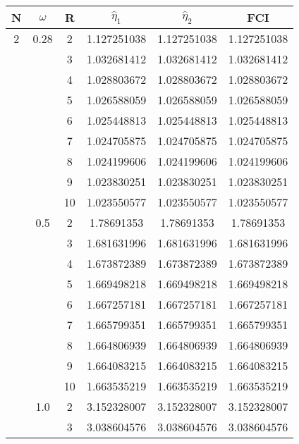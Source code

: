 \begin{table}[h!]
\begin{center}

\begin{tabular}{|c|c|c|c|c|c|}
\hline\hline
N&$\omega$ &R & $\hat{\eta}_1$ & $\hat{\eta}_2$ & FCI \\
\hline    
2 &  0.28   & 2 &  1.127251038    & 1.127251038   & 1.127251038        \\
 &         & 3 & 1.032681412     & 1.032681412   & 1.032681412            \\
 &         & 4 & 1.028803672     & 1.028803672   & 1.028803672            \\
 &         & 5 & 1.026588059     & 1.026588059      & 1.026588059         \\
 &         & 6 & 1.025448813     & 1.025448813   & 1.025448813          \\
 &         & 7 & 1.024705875     & 1.024705875    & 1.024705875        \\
 &         & 8 & 1.024199606    & 1.024199606      & 1.024199606          \\
 &         & 9 & 1.023830251    & 1.023830251    & 1.023830251          \\
 &         & 10& 1.023550577    & 1.023550577    & 1.023550577           \\  
 \hline  
 &  0.5   & 2 & 1.78691353      & 1.78691353   &  1.78691353          \\
 &         & 3 & 1.681631996    & 1.681631996    & 1.681631996          \\
 &         & 4 & 1.673872389    & 1.673872389    & 1.673872389         \\
 &         & 5 & 1.669498218    & 1.669498218      & 1.669498218          \\
 &         & 6 & 1.667257181    & 1.667257181    & 1.667257181        \\
 &         & 7 & 1.665799351    &  1.665799351     & 1.665799351       \\
 &         & 8 & 1.664806939    & 1.664806939    & 1.664806939        \\
 &         & 9 & 1.664083215    & 1.664083215    & 1.664083215           \\
 &         & 10& 1.663535219    & 1.663535219       & 1.663535219          \\ 
 \hline   
 &  1.0    & 2 & 3.152328007    & 3.152328007    & 3.152328007      \\
 &         & 3 &  3.038604576 &3.038604576 & 3.038604576         \\

\end{tabular}
\end{center}
\end{table}
